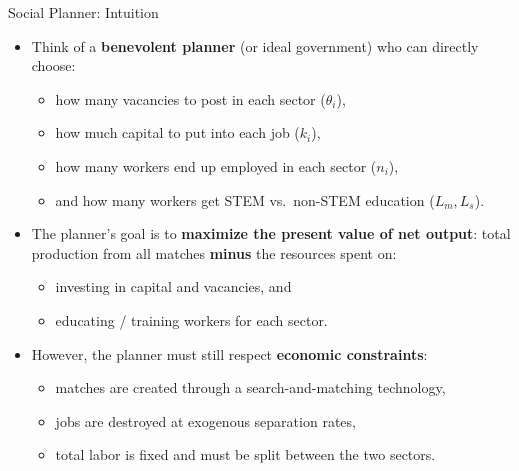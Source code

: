 \documentclass[9pt,xcolor={svgnames}]{beamer}
\begin{document}
\begin{frame}{Social Planner: Intuition}

\begin{itemize}
    \item Think of a \textbf{benevolent planner} (or ideal government) who can directly choose:
    \begin{itemize}
        \item how many vacancies to post in each sector ($\theta_i$),
        \item how much capital to put into each job ($k_i$),
        \item how many workers end up employed in each sector ($n_i$),
        \item and how many workers get STEM vs.\ non-STEM education ($L_m, L_s$).
    \end{itemize}

    \medskip

    \item The planner’s goal is to \textbf{maximize the present value of net output}:  
    total production from all matches \textbf{minus} the resources spent on:
    \begin{itemize}
        \item investing in capital and vacancies, and
        \item educating / training workers for each sector.
    \end{itemize}

    \medskip

    \item However, the planner must still respect \textbf{economic constraints}:
    \begin{itemize}
        \item matches are created through a search-and-matching technology,
        \item jobs are destroyed at exogenous separation rates,
        \item total labor is fixed and must be split between the two sectors.
    \end{itemize}

\end{itemize}

\end{frame}
\end{document}
